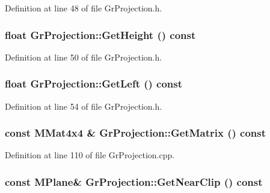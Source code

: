 Definition at line 48 of file GrProjection.h.\hypertarget{class_gr_projection_e09864554d7c9d1d2a28545bccb92fa4}{
\subsubsection[{GetHeight}]{\setlength{\rightskip}{0pt plus 5cm}float GrProjection::GetHeight () const}}
\label{class_gr_projection_e09864554d7c9d1d2a28545bccb92fa4}




Definition at line 50 of file GrProjection.h.\hypertarget{class_gr_projection_259e5d940d8cd6685eafe37eb541238e}{
\subsubsection[{GetLeft}]{\setlength{\rightskip}{0pt plus 5cm}float GrProjection::GetLeft () const}}
\label{class_gr_projection_259e5d940d8cd6685eafe37eb541238e}




Definition at line 54 of file GrProjection.h.\hypertarget{class_gr_projection_1255da0c4733b6c9b53bb6d7266a6315}{
\subsubsection[{GetMatrix}]{\setlength{\rightskip}{0pt plus 5cm}const {\bf MMat4x4} \& GrProjection::GetMatrix () const}}
\label{class_gr_projection_1255da0c4733b6c9b53bb6d7266a6315}




Definition at line 110 of file GrProjection.cpp.\hypertarget{class_gr_projection_4d85a9dab08ee6ed9e840d34c1d9ea4e}{
\subsubsection[{GetNearClip}]{\setlength{\rightskip}{0pt plus 5cm}const {\bf MPlane}\& GrProjection::GetNearClip () const}}
\label{class_gr_projection_4d85a9dab08ee6ed9e840d34c1d9ea4e}




